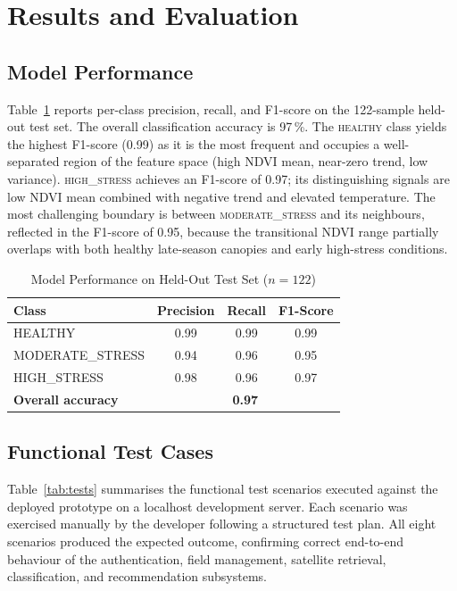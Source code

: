 \documentclass[conference]{IEEEtran}
\begin{document}
\section{Results and Evaluation}

\subsection{Model Performance}

Table~\ref{tab:model} reports per-class precision, recall, and F1-score
on the 122-sample held-out test set. The overall classification accuracy
is 97\,\%. The \textsc{healthy} class yields the highest F1-score (0.99)
as it is the most frequent and occupies a well-separated region of the
feature space (high NDVI mean, near-zero trend, low variance).
\textsc{high\_stress} achieves an F1-score of 0.97; its distinguishing
signals are low NDVI mean combined with negative trend and elevated
temperature. The most challenging boundary is between
\textsc{moderate\_stress} and its neighbours, reflected in the F1-score
of 0.95, because the transitional NDVI range partially overlaps with both
healthy late-season canopies and early high-stress conditions.

\begin{table}[!t]
\caption{Model Performance on Held-Out Test Set ($n = 122$)}
\label{tab:model}
\centering
\footnotesize
\begin{tabular}{lccc}
\toprule
\textbf{Class} & \textbf{Precision} & \textbf{Recall} &
\textbf{F1-Score} \\
\midrule
HEALTHY          & 0.99 & 0.99 & 0.99 \\
MODERATE\_STRESS & 0.94 & 0.96 & 0.95 \\
HIGH\_STRESS     & 0.98 & 0.96 & 0.97 \\
\midrule
\textbf{Overall accuracy} & \multicolumn{3}{c}{\textbf{0.97}} \\
\bottomrule
\end{tabular}
\end{table}

\subsection{Functional Test Cases}

Table~\ref{tab:tests} summarises the functional test scenarios executed
against the deployed prototype on a localhost development server. Each
scenario was exercised manually by the developer following a structured
test plan. All eight scenarios produced the expected outcome, confirming
correct end-to-end behaviour of the authentication, field management,
satellite retrieval, classification, and recommendation subsystems.
\end{document}
